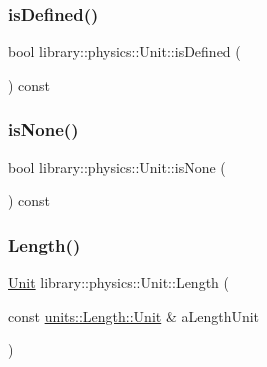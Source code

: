 \mbox{\label{classlibrary_1_1physics_1_1_unit_a6b02591316b1ccb0599a7c71bc8cbcee}} 
\subsubsection{\texorpdfstring{is\+Defined()}{isDefined()}}
{\footnotesize\ttfamily bool library\+::physics\+::\+Unit\+::is\+Defined (\begin{DoxyParamCaption}{ }\end{DoxyParamCaption}) const}

\mbox{\label{classlibrary_1_1physics_1_1_unit_a0d08993fcb83ad73a3155a883b1357bd}} 
\subsubsection{\texorpdfstring{is\+None()}{isNone()}}
{\footnotesize\ttfamily bool library\+::physics\+::\+Unit\+::is\+None (\begin{DoxyParamCaption}{ }\end{DoxyParamCaption}) const}

\mbox{\label{classlibrary_1_1physics_1_1_unit_aa7402b752586ccd442d56cf340ee9c7a}} 
\subsubsection{\texorpdfstring{Length()}{Length()}}
{\footnotesize\ttfamily \hyperlink{classlibrary_1_1physics_1_1_unit}{Unit} library\+::physics\+::\+Unit\+::\+Length (\begin{DoxyParamCaption}\item[{const \hyperlink{classlibrary_1_1physics_1_1units_1_1_length_a3b8b39cd245cf6b19dc34459baeccb18}{units\+::\+Length\+::\+Unit} \&}]{a\+Length\+Unit }\end{DoxyParamCaption})\hspace{0.3cm}{\ttfamily [static]}}

